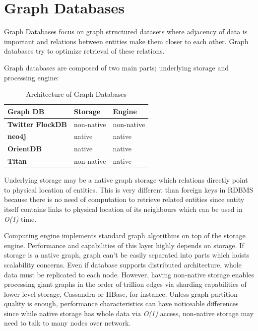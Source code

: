 \section{Graph Databases}

Graph Databases focus on graph structured datasets where adjacency of data is important and relations between entities make them closer to each other.
Graph databases try to optimize retrieval of these relations.

Graph databases are composed of two main parts; underlying storage and processing engine:

\begin{table}[!ht]
  \centering
  \caption{Architecture of Graph Databases}
  \renewcommand{\arraystretch}{1.5}
  \begin{tabular}{| >{\centering\bfseries}m{2in} | >{\centering}m{1in} | >{\centering\arraybackslash}m{1in} |}
	\hline
    \textbf{Graph DB} & \textbf{Storage} & \textbf{Engine} \\ \hline
	Twitter FlockDB & non-native & non-native \\ \hline
	neo4j & native & native \\ \hline
	OrientDB & native & native \\ \hline
	Titan & non-native & native \\ \hline
  \end{tabular}
  \label{orientdb}
\end{table}

Underlying storage may be a native graph storage which relations directly point to physical location of entities. This is very different than foreign keys in RDBMS because there is no need of computation to retrieve related entities since entity itself contains links to physical location of its neighbours which can be used in \textit{O(1)} time.

Computing engine implements standard graph algorithms on top of the storage engine. Performance and capabilities of this layer highly depends on storage. If storage is a native graph, graph can't be easily separated into parts which hoists scalability concerns. Even if database supports distributed architecture, whole data must be replicated to each node. However, having non-native storage enables processing giant graphs in the order of trillion edges via sharding capabilities of lower level storage, Cassandra or HBase, for instance. Unless graph partition quality is enough, performance characteristics can have noticeable differences since while native storage has whole data via \textit{O(1)} access, non-native storage may need to talk to many nodes over network.

